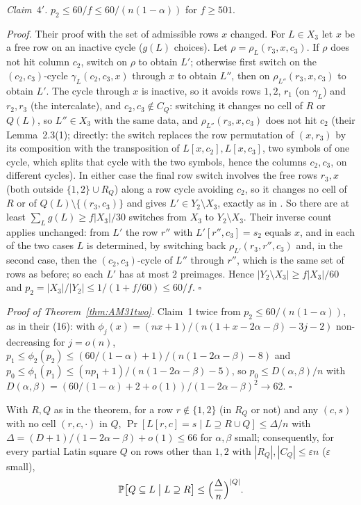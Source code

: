\emph{Claim~$4'$.}  $p_2\le60/f\le60/(n(1-\alpha))$ for $f\ge501$.

\emph{Proof.}  Their proof with the set of admissible rows $x$ changed.
For $L\in X_3$ let $x$ be a free row on an inactive cycle ($g(L)$
choices).  Let $\rho=\rho_L(r_3,x,c_3)$.  If $\rho$ does not hit column
$c_2$, switch on $\rho$ to obtain $L'$; otherwise first switch on the
$(c_2,c_3)$-cycle $\gamma_L(c_2,c_3,x)$ through $x$ to obtain $L''$, then
on $\rho_{L''}(r_3,x,c_3)$ to obtain $L'$.  The cycle through $x$ is
inactive, so it avoids rows $1,2$, $r_1$ (on $\gamma_L$) and $r_2,r_3$
(the intercalate), and $c_2,c_3\notin C_Q$: switching it changes no
cell of $R$ or $Q(L)$, so $L''\in X_3$ with the same data, and
$\rho_{L''}(r_3,x,c_3)$ does not hit $c_2$ (their Lemma~2.3(1); directly:
the switch replaces the row permutation of $(x,r_3)$ by its composition
with the transposition of $L[x,c_2],L[x,c_3]$, two symbols of one
cycle, which splits that cycle with the two symbols, hence the columns
$c_2,c_3$, on different cycles).  In either case
the final row switch involves the free rows $r_3,x$ (both outside
$\{1,2\}\cup R_Q$) along a row cycle avoiding $c_2$, so it changes no
cell of $R$ or of $Q(L)\setminus\{(r_3,c_3)\}$ and gives
$L'\in Y_2\setminus X_3$, exactly as in \cite{AM26}.  So there are at
least $\sum_Lg(L)\ge f|X_3|/30$ switches from $X_3$ to $Y_2\setminus X_3$.
Their inverse count applies unchanged: from $L'$ the row $r''$ with
$L'[r'',c_3]=s_2$ equals $x$, and in each of the two cases $L$ is
determined, by switching back $\rho_{L'}(r_3,r'',c_3)$ and, in the
second case, then the $(c_2,c_3)$-cycle of $L''$ through $r''$, which is
the same set of rows as before; so each $L'$ has at most $2$ preimages.
Hence $|Y_2\setminus X_3|\ge f|X_3|/60$ and
$p_2=|X_3|/|Y_2|\le1/(1+f/60)\le60/f$.  $\square$

\emph{Proof of Theorem~\ref{thm:AM31two}.}  Claim~1 twice from
$p_2\le60/(n(1-\alpha))$, as in their (16): with
$\phi_j(x)=(nx+1)/(n(1+x-2\alpha-\beta)-3j-2)$ non-decreasing for
$j=o(n)$, $p_1\le\phi_2(p_2)\le(60/(1-\alpha)+1)/(n(1-2\alpha-\beta)-8)$
and $p_0\le\phi_1(p_1)\le(np_1+1)/(n(1-2\alpha-\beta)-5)$, so
$p_0\le D(\alpha,\beta)/n$ with
$D(\alpha,\beta)=(60/(1-\alpha)+2+o(1))/(1-2\alpha-\beta)^2\to62$.  $\square$

\begin{corollary}\label{cor:FCtwo}
With $R,Q$ as in the theorem, for a row $r\notin\{1,2\}$ (in $R_Q$ or
not) and any $(c,s)$ with no cell $(r,c,\cdot)$ in $Q$,
$\Pr[L[r,c]=s\mid L\supseteq R\cup Q]\le\Delta/n$ with
$\Delta=(D+1)/(1-2\alpha-\beta)+o(1)\le66$ for $\alpha,\beta$ small; consequently, for every
partial Latin square $Q$ on rows other than $1,2$ with
$|R_Q|,|C_Q|\le\varepsilon n$ ($\varepsilon$ small),
\[
\Pr\bigl[Q\subseteq L\;\big|\;L\supseteq R\bigr]\le\Bigl(\frac{\Delta}{n}\Bigr)^{|Q|}.
\]
\end{corollary}


